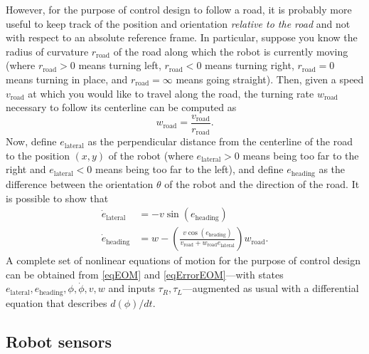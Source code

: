 \documentclass[conf]{new-aiaa}
\begin{document}
However, for the purpose of control design to follow a road, it is probably more useful to keep track of the position and orientation {\em relative to the road} and not with respect to an absolute reference frame. In particular, suppose you know the radius of curvature $r_\text{road}$ of the road along which the robot is currently moving (where $r_\text{road}>0$ means turning left, $r_\text{road}<0$ means turning right, $r_\text{road}=0$ means turning in place, and $r_\text{road}=\infty$ means going straight). Then, given a speed $v_\text{road}$ at which you would like to travel along the road, the turning rate $w_\text{road}$ necessary to follow its centerline can be computed as
\begin{equation}
\label{eqCurvature}
w_\text{road} = \frac{v_\text{road}}{r_\text{road}}.
\end{equation}
Now, define $e_\text{lateral}$ as the perpendicular distance from the centerline of the road to the position $(x,y)$ of the robot (where $e_\text{lateral}>0$ means being too far to the right and $e_\text{lateral}<0$ means being too far to the left), and define $e_\text{heading}$ as the difference between the orientation $\theta$ of the robot and the direction of the road. It is possible to show that
\begin{equation}
\label{eqErrorEOM}
\begin{aligned}
\dot{e}_\text{lateral} &= -v\sin\left(e_\text{heading}\right) \\
\dot{e}_\text{heading} &= w-\left(\frac{v\cos\left(e_\text{heading}\right)}{v_\text{road}+w_\text{road}e_\text{lateral}}\right)w_\text{road}.
\end{aligned}
\end{equation}
A complete set of nonlinear equations of motion for the purpose of control design can be obtained from \eqref{eqEOM} and \eqref{eqErrorEOM}---with states $e_\text{lateral}, e_\text{heading}, \phi, \dot{\phi}, v, w$ and inputs $\tau_{R},\tau_{L}$---augmented as usual with a differential equation that describes $d(\phi)/dt$.

\subsection{Robot sensors}
\end{document}
